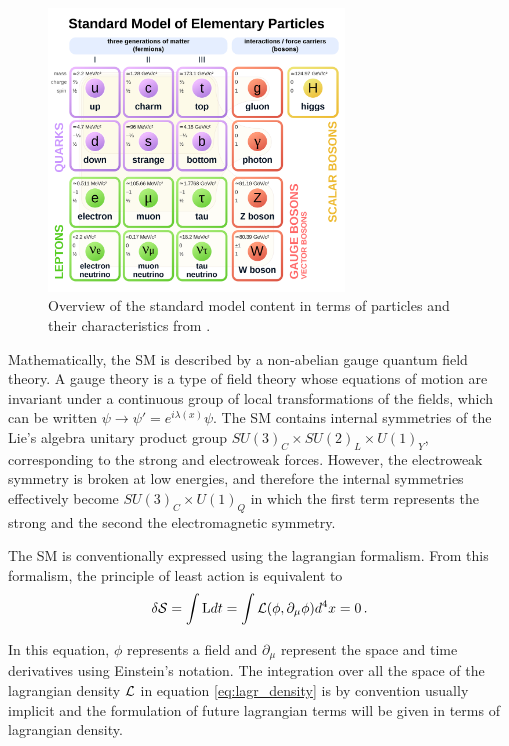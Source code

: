 \begin{figure}
    \centering
    \includegraphics[width=0.7\textwidth]{Images/SM_zoo.png}
    \caption{Overview of the standard model content in terms of particles and their characteristics from \cite{SMschema}.}
    \label{fig:SM}
\end{figure}

Mathematically, the SM is described by a non-abelian gauge quantum field theory. A gauge theory is a type of field theory whose equations of motion are invariant under a continuous group of local transformations of the fields, which can be written $\psi \rightarrow \psi' = e^{i\lambda(x)}\psi$. The SM contains internal symmetries of the Lie's algebra unitary product group $SU(3)_C \times SU(2)_L \times U(1)_Y$, corresponding to the strong and electroweak forces. However, the electroweak symmetry is broken at low energies, and therefore the internal symmetries effectively become $SU(3)_C \times U(1)_Q$ in which the first term represents the strong and the second the electromagnetic symmetry.

The SM is conventionally expressed using the lagrangian formalism. From this formalism, the principle of least action is equivalent to \cite{Thomson:2013zua}
\begin{equation}
    \delta \mathcal{S} = \int \mathrm{L} dt = \int \Lagr(\phi,\partial_{\mu}\phi) d^4 x = 0 \mend
    \label{eq:lagr_density}
\end{equation}

In this equation, $\phi$ represents a field and $\partial_{\mu}$ represent the space and time derivatives using Einstein's notation. The integration over all the space of the lagrangian density $\mathcal{L}$ in equation \ref{eq:lagr_density} is by convention usually implicit and the formulation of future lagrangian terms will be given in terms of lagrangian density.\newline

